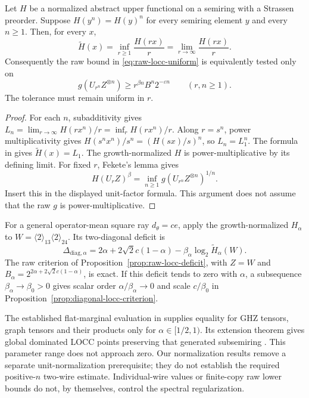 \begin{lemma}\label{lem:power-upper-unit-regularization}
Let \(H\) be a normalized abstract upper functional on a semiring with a
Strassen preorder. Suppose \(H(y^n)=H(y)^n\) for every semiring element
\(y\) and every \(n\geq1\). Then, for every \(x\),
\[
 \widetilde H(x)=\inf_{r\geq1}\frac{H(rx)}r
 =\lim_{r\longrightarrow\infty}\frac{H(rx)}r.
\]
Consequently the raw bound in \eqref{eq:raw-locc-uniform} is equivalently
tested only on
\[
 g(U_{r^n}Z^{\otimes n})
 \geq r^{\beta n}B^n2^{-\varepsilon n}
 \qquad(r,n\geq1).
\]
The tolerance must remain uniform in \(r\).
\end{lemma}
\begin{proof}
For each \(n\), subadditivity gives
\(L_n=\lim_{r\to\infty}H(rx^n)/r=\inf_rH(rx^n)/r\).
Along \(r=s^n\), power multiplicativity gives
\(H(s^nx^n)/s^n=(H(sx)/s)^n\), so \(L_n=L_1^n\).
The formula in \cite[Proposition~3.15]{BugarVrana2025} gives
\(\widetilde H(x)=L_1\).
The growth-normalized \(H\) is power-multiplicative by its defining limit.
For fixed \(r\), Fekete's lemma gives
\[
 H(U_rZ)^\beta=\inf_{n\geq1}
             g(U_{r^n}Z^{\otimes n})^{1/n}.
\]
Insert this in the displayed unit-factor formula.
This argument does not assume that the raw \(g\) is power-multiplicative.
\end{proof}


For a general operator-mean square ray \(d_\theta=c e\), apply the
growth-normalized \(H_\alpha\) to \(W=\langle2\rangle_{13}\langle2\rangle_{24}\).
Its two-diagonal deficit is
\[
 \Delta_{\mathrm{diag},\alpha}
 =2\alpha+2\sqrt2c(1-\alpha)
       -\beta_\alpha\log_2\widetilde H_\alpha(W).
\]
The raw criterion of Proposition~\ref{prop:raw-locc-deficit}, with
\(Z=W\) and \(B_\alpha=2^{2\alpha+2\sqrt2c(1-\alpha)}\), is exact.
If this deficit tends to zero with \(\alpha\), a subsequence
\(\beta_\alpha\to\beta_0>0\) gives scalar order
\(\alpha/\beta_\alpha\to0\) and scale \(c/\beta_0\) in
Proposition~\ref{prop:diagonal-locc-criterion}.

The established flat-marginal evaluation in
\cite[Corollary~5.5, p.~2821]{BugarVrana2025} supplies equality for
GHZ tensors, graph tensors and their products only for
\(\alpha\in[1/2,1)\). Its extension theorem gives global dominated
LOCC points preserving that generated subsemiring
\cite[Corollary~3.24, p.~2805]{BugarVrana2025}.
This parameter range does not approach zero.
Our normalization results remove a separate unit-normalization
prerequisite; they do not establish the required positive-\(n\)
two-wire estimate. Individual-wire values or finite-copy raw lower
bounds do not, by themselves, control the spectral regularization.
